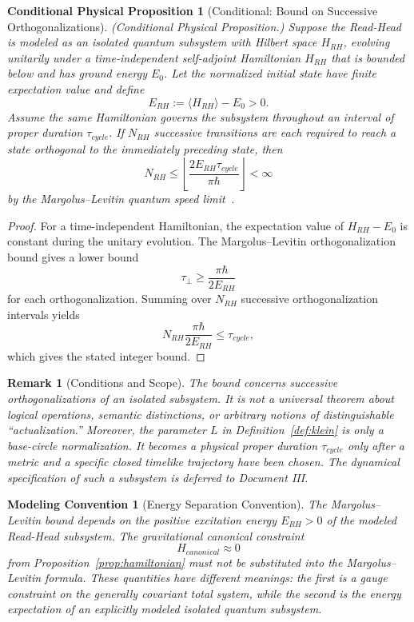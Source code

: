 \documentclass[11pt]{article}
\theoremstyle{canonmath}
\newtheorem{remark}[theorem]{Remark}
\theoremstyle{canonpostulate}
\theoremstyle{canonproposition}
\newtheorem{proposition}{Conditional Physical Proposition}[section]
\newtheorem{principle}{Modeling Convention}[section]
\def\mathrm#1{#1}%
\def\mathcal#1{#1}%
\begin{document}
\begin{proposition}[Conditional: Bound on Successive Orthogonalizations] \label{prop:capacity}
\emph{(Conditional Physical Proposition.)} Suppose the Read-Head is modeled as an isolated quantum subsystem with Hilbert space $\mathcal H_{\mathrm{RH}}$, evolving unitarily under a time-independent self-adjoint Hamiltonian $H_{\mathrm{RH}}$ that is bounded below and has ground energy $E_0$. Let the normalized initial state have finite expectation value and define
\[
E_{\mathrm{RH}}:=\langle H_{\mathrm{RH}}\rangle-E_0>0.
\]
Assume the same Hamiltonian governs the subsystem throughout an interval of proper duration $\tau_{\mathrm{cycle}}$. If $N_{\mathrm{RH}}$ successive transitions are each required to reach a state orthogonal to the immediately preceding state, then
\begin{equation}
    N_{\mathrm{RH}}
    \leq
    \left\lfloor
    \frac{2E_{\mathrm{RH}}\tau_{\mathrm{cycle}}}{\pi\hbar}
    \right\rfloor
    <\infty
\end{equation}
by the Margolus--Levitin quantum speed limit~\cite{margolus}.
\end{proposition}
\begin{proof}
For a time-independent Hamiltonian, the expectation value of $H_{\mathrm{RH}}-E_0$ is constant during the unitary evolution. The Margolus--Levitin orthogonalization bound gives a lower bound
\[
\tau_\perp\ge\frac{\pi\hbar}{2E_{\mathrm{RH}}}
\]
for each orthogonalization. Summing over $N_{\mathrm{RH}}$ successive orthogonalization intervals yields
\[
N_{\mathrm{RH}}\frac{\pi\hbar}{2E_{\mathrm{RH}}}
\leq\tau_{\mathrm{cycle}},
\]
which gives the stated integer bound.
\end{proof}

\begin{remark}[Conditions and Scope]
The bound concerns successive \emph{orthogonalizations} of an isolated subsystem. It is not a universal theorem about logical operations, semantic distinctions, or arbitrary notions of distinguishable ``actualization.'' Moreover, the parameter $L$ in Definition~\ref{def:klein} is only a base-circle normalization. It becomes a physical proper duration $\tau_{\mathrm{cycle}}$ only after a metric and a specific closed timelike trajectory have been chosen. The dynamical specification of such a subsystem is deferred to Document III.
\end{remark}

\begin{principle}[Energy Separation Convention] \label{principle:energy}
The Margolus--Levitin bound depends on the positive excitation energy $E_{\mathrm{RH}}>0$ of the modeled Read-Head subsystem. The gravitational canonical constraint
\[
H_{\mathrm{canonical}}\approx0
\]
from Proposition~\ref{prop:hamiltonian} must not be substituted into the Margolus--Levitin formula. These quantities have different meanings: the first is a gauge constraint on the generally covariant total system, while the second is the energy expectation of an explicitly modeled isolated quantum subsystem.
\end{principle}
\end{document}
